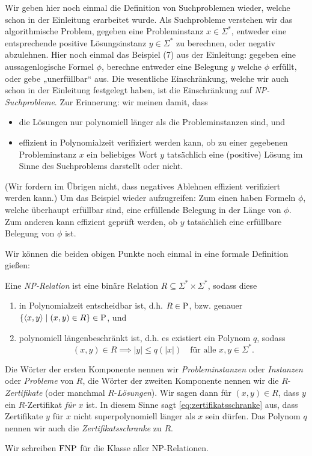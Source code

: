 Wir geben hier noch einmal die Definition von Suchproblemen wieder, welche schon in der Einleitung erarbeitet wurde.
Als Suchprobleme verstehen wir das algorithmische Problem, gegeben eine Probleminstanz $x\in\Sigma^*$, entweder eine entsprechende positive Lösungsinstanz $y\in\Sigma^*$ zu berechnen, oder negativ abzulehnen.  Hier noch einmal das Beispiel (7) aus der Einleitung: gegeben eine aussagenlogische Formel $\phi$, berechne entweder eine Belegung $y$ welche $\phi$ erfüllt, oder gebe „unerfüllbar“ aus.
Die wesentliche Einschränkung, welche wir auch schon in der Einleitung festgelegt haben, ist die Einschränkung auf \emph{NP-Suchprobleme}. Zur Erinnerung: wir meinen damit, dass
\begin{itemize}
    \item die Lösungen nur polynomiell länger als die Probleminstanzen sind, und
    \item effizient in Polynomialzeit verifiziert werden kann, ob zu einer gegebenen Probleminstanz $x$ ein beliebiges Wort $y$ tatsächlich eine (positive) Lösung im Sinne des Suchproblems darstellt oder nicht.
\end{itemize}
(Wir fordern im Übrigen nicht, dass negatives Ablehnen effizient verifiziert werden kann.)
Um das Beispiel wieder aufzugreifen: Zum einen haben Formeln $\phi$, welche überhaupt erfüllbar sind, eine erfüllende Belegung in der Länge von $\phi$. Zum anderen kann effizient geprüft werden, ob $y$ tatsächlich eine erfüllbare Belegung von $\phi$ ist.

Wir können die beiden obigen Punkte noch einmal in eine formale Definition gießen:\pagebreak[3]

\begin{definition}\label{def:np-relation}
    Eine \emph{NP-Relation} ist eine binäre Relation $R\subseteq \Sigma^*\times\Sigma^*$, sodass diese
    \begin{enumerate}
        \item in Polynomialzeit entscheidbar ist, d.h. $R\in\P$, bzw. genauer $\{\langle x, y\rangle \mid (x,y)\in R\}\in\P$, und
        \item polynomiell längenbeschränkt ist, d.h. es existiert ein Polynom $q$, sodass
            \begin{equation}\label{eq:zertifikatsschranke}
                (x,y)\in R \implies |y|\leq q(|x|) \quad\text{für alle $x,y\in\Sigma^*$}.
            \end{equation}
    \end{enumerate}
    Die Wörter der ersten Komponente nennen wir \emph{Probleminstanzen} oder \emph{Instanzen} oder \emph{Probleme} von $R$, die Wörter der zweiten Komponente nennen wir die $R$-\emph{Zertifikate} (oder manchmal $R$-\emph{Lösungen}). Wir sagen dann für $(x,y)\in R$, dass $y$ ein $R$-Zertifikat \emph{für $x$} ist. In diesem Sinne sagt \eqref{eq:zertifikatsschranke}  aus, dass Zertifikate $y$ für $x$ nicht superpolynomiell länger als $x$ sein dürfen.
    Das Polynom $q$ nennen wir auch die \emph{Zertifikatsschranke} zu $R$. 

    Wir schreiben $\FNP$ für die Klasse aller NP-Relationen. \qedhere
\end{definition}

